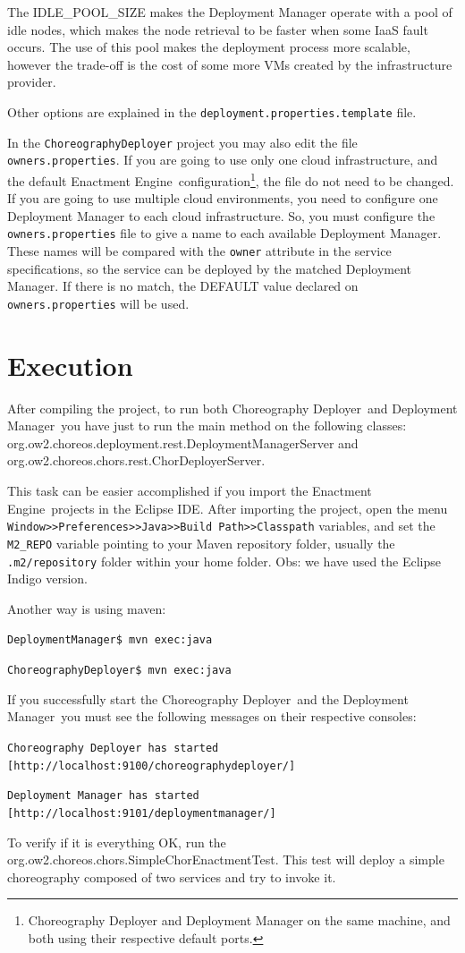 \documentclass[a4paper, 10pt]{article}
\newcommand{\ee}{Enactment Engine}
\newcommand{\cd}{Choreography Deployer}
\newcommand{\dm}{Deployment Manager}
\begin{document}
The IDLE\_POOL\_SIZE makes the Deployment Manager operate with a pool of idle nodes, which makes the node retrieval to be faster when some IaaS fault occurs. The use of this pool makes the deployment process more scalable, however the trade-off is the cost of some more VMs created by the infrastructure provider. 

Other options are explained in the \texttt{deployment.properties.template} file.

In the \texttt{ChoreographyDeployer} project you may also edit the file \texttt{owners.properties}. If you are going to use only one cloud infrastructure, and the default \ee\ configuration\footnote{Choreography Deployer and Deployment Manager on the same machine, and both using their respective default ports.}, the file do not need to be changed. If you are going to use multiple cloud environments, you need to configure one Deployment Manager to each cloud infrastructure. So, you must configure the \texttt{owners.properties} file to give a name to each available Deployment Manager. These names will be compared with the \texttt{owner} attribute in the  service specifications, so the service can be deployed by the matched Deployment Manager. If there is no match, the DEFAULT value declared on \texttt{owners.properties} will be used.

\section{Execution}

After compiling the project, to run both \cd\ and \dm\ you have just to run the main method on the following classes: \textsf{org.ow2.choreos.deployment.rest.DeploymentManagerServer} and \textsf{org.ow2.choreos.chors.rest.ChorDeployerServer}.

This task can be easier accomplished if you import the \ee\ projects in the Eclipse IDE. After importing the project, open the menu \texttt{Window>>Preferences>>Java>>Build Path>>Classpath} variables, and set the \texttt{M2\_REPO} variable pointing to your Maven repository folder, usually the \texttt{.m2/repository} folder within your home folder. Obs: we have used the Eclipse Indigo version.

Another way is using maven:

\texttt{DeploymentManager\$ mvn exec:java}

\texttt{ChoreographyDeployer\$ mvn exec:java}

If you successfully start the \cd\ and the \dm\, you must see the following messages on their respective consoles: 

\texttt{\cd\ has started [http://localhost:9100/choreographydeployer/]}

\texttt{\dm\ has started [http://localhost:9101/deploymentmanager/]}

To verify if it is everything OK, run the \textsf{org.ow2.choreos.chors.SimpleChorEnactmentTest}. This test will deploy a simple choreography composed of two services and try to invoke it.
\end{document}
